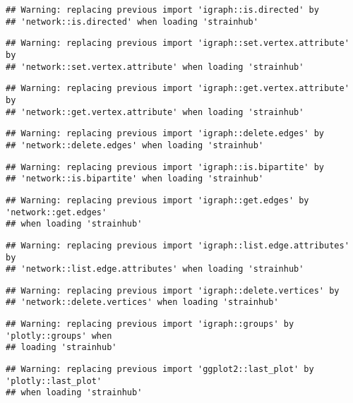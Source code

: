\documentclass[
]{article}
\begin{document}
\begin{verbatim}
## Warning: replacing previous import 'igraph::is.directed' by
## 'network::is.directed' when loading 'strainhub'
\end{verbatim}

\begin{verbatim}
## Warning: replacing previous import 'igraph::set.vertex.attribute' by
## 'network::set.vertex.attribute' when loading 'strainhub'
\end{verbatim}

\begin{verbatim}
## Warning: replacing previous import 'igraph::get.vertex.attribute' by
## 'network::get.vertex.attribute' when loading 'strainhub'
\end{verbatim}

\begin{verbatim}
## Warning: replacing previous import 'igraph::delete.edges' by
## 'network::delete.edges' when loading 'strainhub'
\end{verbatim}

\begin{verbatim}
## Warning: replacing previous import 'igraph::is.bipartite' by
## 'network::is.bipartite' when loading 'strainhub'
\end{verbatim}

\begin{verbatim}
## Warning: replacing previous import 'igraph::get.edges' by 'network::get.edges'
## when loading 'strainhub'
\end{verbatim}

\begin{verbatim}
## Warning: replacing previous import 'igraph::list.edge.attributes' by
## 'network::list.edge.attributes' when loading 'strainhub'
\end{verbatim}

\begin{verbatim}
## Warning: replacing previous import 'igraph::delete.vertices' by
## 'network::delete.vertices' when loading 'strainhub'
\end{verbatim}

\begin{verbatim}
## Warning: replacing previous import 'igraph::groups' by 'plotly::groups' when
## loading 'strainhub'
\end{verbatim}

\begin{verbatim}
## Warning: replacing previous import 'ggplot2::last_plot' by 'plotly::last_plot'
## when loading 'strainhub'
\end{verbatim}
\end{document}
